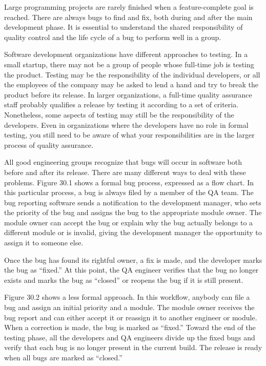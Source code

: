 
Large programming projects are rarely finished when a feature-complete goal is reached. There are always bugs to find and fix, both during and after the main development phase. It is essential to understand the shared responsibility of quality control and the life cycle of a bug to perform well in a group.


Software development organizations have different approaches to testing. In a small startup, there may not be a group of people whose full-time job is testing the product. Testing may be the responsibility of the individual developers, or all the employees of the company may be asked to lend a hand and try to break the product before its release. In larger organizations, a full-time quality assurance staff probably qualifies a release by testing it according to a set of criteria. Nonetheless, some aspects of testing may still be the responsibility of the developers. Even in organizations where the developers have no role in formal testing, you still need to be aware of what your responsibilities are in the larger process of quality assurance.


All good engineering groups recognize that bugs will occur in software both before and after its release. There are many different ways to deal with these problems. Figure 30.1 shows a formal bug process, expressed as a flow chart. In this particular process, a bug is always filed by a member of the QA team. The bug reporting software sends a notification to the development manager, who sets the priority of the bug and assigns the bug to the appropriate module owner. The module owner can accept the bug or explain why the bug actually belongs to a different module or is invalid, giving the development manager the opportunity to assign it to someone else.

Once the bug has found its rightful owner, a fix is made, and the developer marks the bug as “fixed.” At this point, the QA engineer verifies that the bug no longer exists and marks the bug as “closed” or reopens the bug if it is still present.


Figure 30.2 shows a less formal approach. In this workflow, anybody can file a bug and assign an initial priority and a module. The module owner receives the bug report and can either accept it or reassign it to another engineer or module. When a correction is made, the bug is marked as “fixed.” Toward the end of the testing phase, all the developers and QA engineers divide up the fixed bugs and verify that each bug is no longer present in the current build. The release is ready when all bugs are marked as “closed.”

